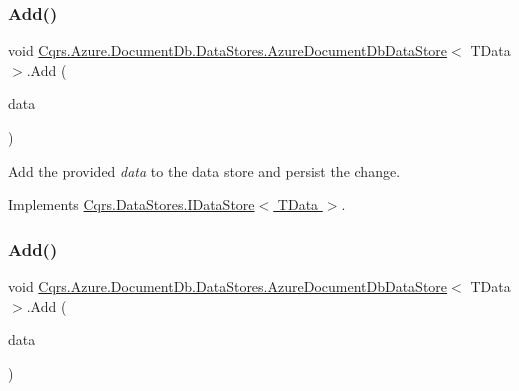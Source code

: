 \subsubsection{\texorpdfstring{Add()}{Add()}\hspace{0.1cm}{\footnotesize\ttfamily [1/2]}}
{\footnotesize\ttfamily void \hyperlink{classCqrs_1_1Azure_1_1DocumentDb_1_1DataStores_1_1AzureDocumentDbDataStore}{Cqrs.\+Azure.\+Document\+Db.\+Data\+Stores.\+Azure\+Document\+Db\+Data\+Store}$<$ T\+Data $>$.Add (\begin{DoxyParamCaption}\item[{T\+Data}]{data }\end{DoxyParamCaption})}



Add the provided {\itshape data}  to the data store and persist the change. 



Implements \hyperlink{interfaceCqrs_1_1DataStores_1_1IDataStore_a114404daaf37fec9cc5547cd9a17858c_a114404daaf37fec9cc5547cd9a17858c}{Cqrs.\+Data\+Stores.\+I\+Data\+Store$<$ T\+Data $>$}.

\mbox{\label{classCqrs_1_1Azure_1_1DocumentDb_1_1DataStores_1_1AzureDocumentDbDataStore_a2d91050f17273687e44a121623803e7a_a2d91050f17273687e44a121623803e7a}} 
\subsubsection{\texorpdfstring{Add()}{Add()}\hspace{0.1cm}{\footnotesize\ttfamily [2/2]}}
{\footnotesize\ttfamily void \hyperlink{classCqrs_1_1Azure_1_1DocumentDb_1_1DataStores_1_1AzureDocumentDbDataStore}{Cqrs.\+Azure.\+Document\+Db.\+Data\+Stores.\+Azure\+Document\+Db\+Data\+Store}$<$ T\+Data $>$.Add (\begin{DoxyParamCaption}\item[{I\+Enumerable$<$ T\+Data $>$}]{data }\end{DoxyParamCaption})}



